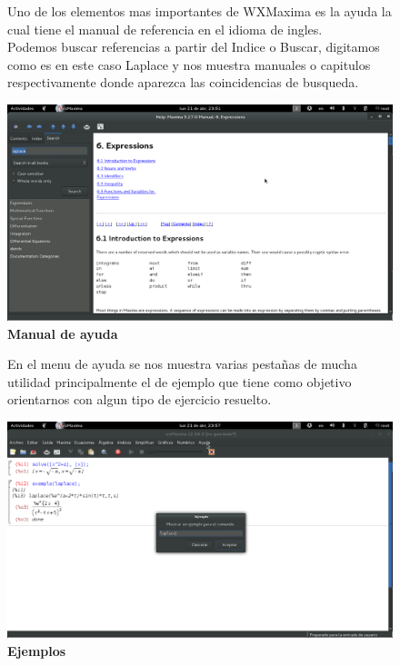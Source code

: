 \documentclass[10pt,a4paper]{book}
\begin{document}
\begin{small}
\begin{figure}[htb]
Uno de los elementos mas importantes de WXMaxima es la ayuda la cual tiene el manual de referencia en el idioma de ingles.\\
Podemos buscar referencias a partir del Indice o Buscar, digitamos como es en este caso Laplace y nos muestra manuales o capitulos respectivamente donde aparezca las coincidencias de busqueda.
\begin{center}
\includegraphics[width=13cm]{fotos/cap11}
\caption{\textbf{Manual de ayuda}}
\end{center}
\end{figure}

\begin{figure}[htb]
En el menu de ayuda se nos muestra varias pestañas de mucha utilidad principalmente el de ejemplo que tiene como objetivo orientarnos con algun tipo de ejercicio resuelto.
\begin{center}

\includegraphics[width=13cm]{fotos/cap12}
\caption{\textbf{Ejemplos}}
\end{center}
\end{figure}
\end{small}
\end{document}
